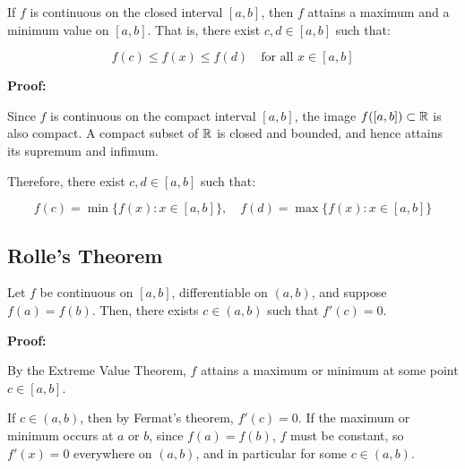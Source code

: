 If \( f \) is continuous on the closed interval \([a, b] \), then \( f \) attains a maximum and a 
minimum value on \([a, b]\). That is, there exist \( c, d \in [a, b] \) such that:

\[
    f(c) \le f(x) \le f(d) \quad \text{for all } x \in [a, b]
\]

\textbf{Proof:}  

Since \( f \) is continuous on the compact interval \([a, b]\), the image \( f([a, b]) \subset \mathbb{R} \) 
is also compact. A compact subset of \( \mathbb{R} \) is closed and bounded, and hence 
attains its supremum and infimum.

Therefore, there exist \( c, d \in [a, b] \) such that:

\[
    f(c) = \min\{f(x): x \in [a, b]\}, \quad
    f(d) = \max\{f(x): x \in [a, b]\}
\]

\QED

\subsection{Rolle’s Theorem}
Let \( f \) be continuous on \([a, b] \), differentiable on \((a, b) \), and suppose \( f(a) = f(b) \).  
Then, there exists \( c \in (a, b) \) such that \( f'(c) = 0 \).
\vspace{\baselineskip}

\textbf{Proof:}  

By the Extreme Value Theorem, \( f \) attains a maximum or minimum at some point \( c \in [a, b] \).

If \( c \in (a, b) \), then by Fermat’s theorem, \( f'(c) = 0 \).  
If the maximum or minimum occurs at \( a \) or \( b \), since \( f(a) = f(b) \), \( f \) must be 
constant, so \( f'(x) = 0 \) everywhere on \((a, b)\), and in particular for some \( c \in (a, b) \).

\QED

\begin{center}
\end{center}



